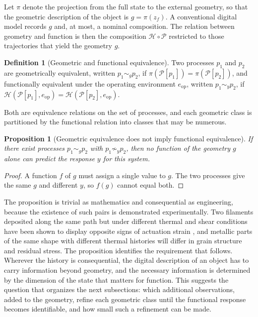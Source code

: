 \documentclass[11pt]{article}
\newtheorem{proposition}{Proposition}
\theoremstyle{definition}
\newtheorem{definition}{Definition}
\newcommand{\Hmap}{\mathcal{H}}
\newcommand{\Pmap}{\mathcal{P}}
\begin{document}
Let $\pi$ denote the projection from the full state to the external geometry, so that the geometric description of the object is $g=\pi(z_f)$. A conventional digital model records $g$ and, at most, a nominal composition. The relation between geometry and function is then the composition $\Hmap\circ\Pmap$ restricted to those trajectories that yield the geometry $g$.

\begin{definition}[Geometric and functional equivalence]
Two processes $p_1$ and $p_2$ are geometrically equivalent, written $p_1\sim_g p_2$, if $\pi(\Pmap[p_1])=\pi(\Pmap[p_2])$, and functionally equivalent under the operating environment $e_{\mathrm{op}}$, written $p_1\sim_y p_2$, if $\Hmap(\Pmap[p_1],e_{\mathrm{op}})=\Hmap(\Pmap[p_2],e_{\mathrm{op}})$.
\end{definition}

Both are equivalence relations on the set of processes, and each geometric class is partitioned by the functional relation into classes that may be numerous.

\begin{proposition}[Geometric equivalence does not imply functional equivalence]
\label{prop:nonid}
If there exist processes $p_1\sim_g p_2$ with $p_1\not\sim_y p_2$, then no function of the geometry $g$ alone can predict the response $y$ for this system.
\end{proposition}

\begin{proof}
A function $f$ of $g$ must assign a single value to $g$. The two processes give the same $g$ and different $y$, so $f(g)$ cannot equal both. \qedhere
\end{proof}

The proposition is trivial as mathematics and consequential as engineering, because the existence of such pairs is demonstrated experimentally. Two filaments deposited along the same path but under different thermal and shear conditions have been shown to display opposite signs of actuation strain \cite{lee2026}, and metallic parts of the same shape with different thermal histories will differ in grain structure and residual stress. The proposition identifies the requirement that follows. Wherever the history is consequential, the digital description of an object has to carry information beyond geometry, and the necessary information is determined by the dimension of the state that matters for function. This suggests the question that organizes the next subsections: which additional observations, added to the geometry, refine each geometric class until the functional response becomes identifiable, and how small such a refinement can be made.
\end{document}
